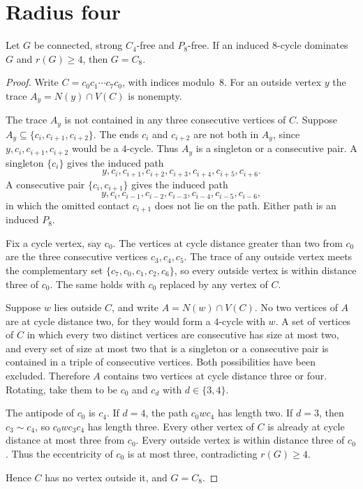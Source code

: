 \documentclass[ASNA]{USG}
\theoremstyle{WBstyletwo}
\numberwithin{equation}{section}
\begin{document}
\section{Radius four}\label{sec:r4}

\begin{lemma}\label{lem:c8}
Let $G$ be connected, strong $C_4$-free and $P_8$-free. If an induced $8$-cycle dominates $G$ and $r(G)\ge 4$, then $G=C_8$.
\end{lemma}

\begin{proof}
Write $C=c_0c_1\cdots c_7c_0$, with indices modulo~$8$. For an outside vertex $y$ the trace $A_y=N(y)\cap V(C)$ is nonempty.

The trace $A_y$ is not contained in any three consecutive vertices of $C$. Suppose $A_y\subseteq\{c_i,c_{i+1},c_{i+2}\}$. The ends $c_i$ and $c_{i+2}$ are not both in $A_y$, since $y,c_i,c_{i+1},c_{i+2}$ would be a $4$-cycle. Thus $A_y$ is a singleton or a consecutive pair. A singleton $\{c_i\}$ gives the induced path
\[
y,c_i,c_{i+1},c_{i+2},c_{i+3},c_{i+4},c_{i+5},c_{i+6}.
\]
A consecutive pair $\{c_i,c_{i+1}\}$ gives the induced path
\[
y,c_i,c_{i-1},c_{i-2},c_{i-3},c_{i-4},c_{i-5},c_{i-6},
\]
in which the omitted contact $c_{i+1}$ does not lie on the path. Either path is an induced $P_8$.

Fix a cycle vertex, say $c_0$. The vertices at cycle distance greater than two from $c_0$ are the three consecutive vertices $c_3,c_4,c_5$. The trace of any outside vertex meets the complementary set $\{c_7,c_0,c_1,c_2,c_6\}$, so every outside vertex is within distance three of $c_0$. The same holds with $c_0$ replaced by any vertex of $C$.

Suppose $w$ lies outside $C$, and write $A=N(w)\cap V(C)$. No two vertices of $A$ are at cycle distance two, for they would form a $4$-cycle with $w$. A set of vertices of $C$ in which every two distinct vertices are consecutive has size at most two, and every set of size at most two that is a singleton or a consecutive pair is contained in a triple of consecutive vertices. Both possibilities have been excluded. Therefore $A$ contains two vertices at cycle distance three or four. Rotating, take them to be $c_0$ and $c_d$ with $d\in\{3,4\}$.

The antipode of $c_0$ is $c_4$. If $d=4$, the path $c_0wc_4$ has length two. If $d=3$, then $c_3\sim c_4$, so $c_0wc_3c_4$ has length three. Every other vertex of $C$ is already at cycle distance at most three from $c_0$. Every outside vertex is within distance three of $c_0$. Thus the eccentricity of $c_0$ is at most three, contradicting $r(G)\ge 4$.

Hence $C$ has no vertex outside it, and $G=C_8$.
\end{proof}
\end{document}
